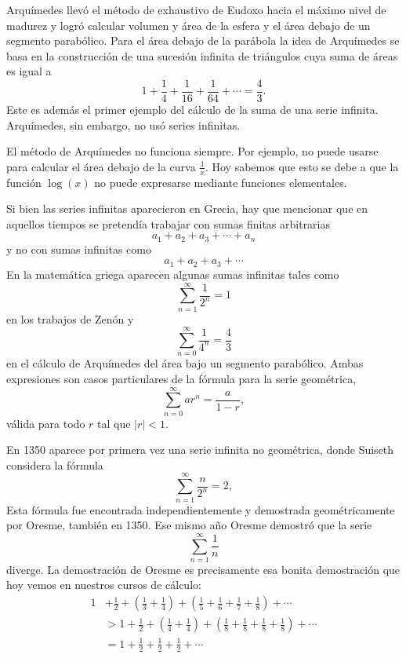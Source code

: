 Arquímedes llevó el método de exhaustivo de Eudoxo hacia el máximo nivel de
madurez y logró calcular volumen y área de la esfera y el área debajo de un
segmento parabólico. Para el área debajo de la parábola la idea de Arquímedes 
se basa en la construcción de una sucesión infinita de triángulos cuya suma 
de áreas es igual a 
\[
	1+\frac14+\frac{1}{16}+\frac{1}{64}+\cdots=\frac43.
\]
Este es además el primer ejemplo del cálculo de la suma de una serie infinita.
Arquímedes, sin embargo, no usó series infinitas.

El método de Arquímedes no funciona siempre. Por ejemplo, no puede usarse para
calcular el área debajo de la curva $\frac{1}{x}$. Hoy sabemos que esto se debe
a que la función $\log(x)$ no puede expresarse mediante funciones elementales.

Si bien las series infinitas aparecieron en Grecia, hay que mencionar que en
aquellos tiempos se pretendía trabajar con sumas finitas arbitrarias 
\[
	a_1+a_2+a_3+\cdots+a_n
\]
y no con sumas infinitas como 
\[
	a_1+a_2+a_3+\cdots
\]
En la matemática griega aparecen algunas sumas infinitas tales como
\[
	\sum_{n=1}^\infty\frac{1}{2^n}=1
\]
en los trabajos de Zenón y  
\[
	\sum_{n=0}^\infty\frac{1}{4^n}=\frac43
\]
en el cálculo de Arquímedes del área bajo un segmento parabólico. Ambas
expresiones son casos particulares de la fórmula para la serie geométrica, 
\[
	\sum_{n=0}^\infty ar^n=\frac{a}{1-r},
\]
válida para todo $r$ tal que $|r|<1$. 

En 1350 aparece por primera vez una serie infinita no geométrica, donde Suiseth
considera la fórmula
\[
	\sum_{n=1}^\infty\frac{n}{2^n}=2,
\]
Esta fórmula fue encontrada independientemente y demostrada geométricamente por
Oresme, también en 1350. Ese mismo año Oresme demostró que la serie 
\[
	\sum_{n=1}^\infty\frac1n
\]
diverge. La demostración de Oresme es precisamente esa bonita demostración que
hoy vemos en nuestros cursos de cálculo:
\begin{align*}
	1&+\frac12+\left(\frac13+\frac14\right)+\left(\frac15+\frac16+\frac17+\frac18\right)+\cdots\\
	&>1+\frac12+\left(\frac14+\frac14\right)+\left(\frac18+\frac18+\frac18+\frac18\right)+\cdots\\
	&=1+\frac12+\frac12+\frac12+\cdots
\end{align*}

